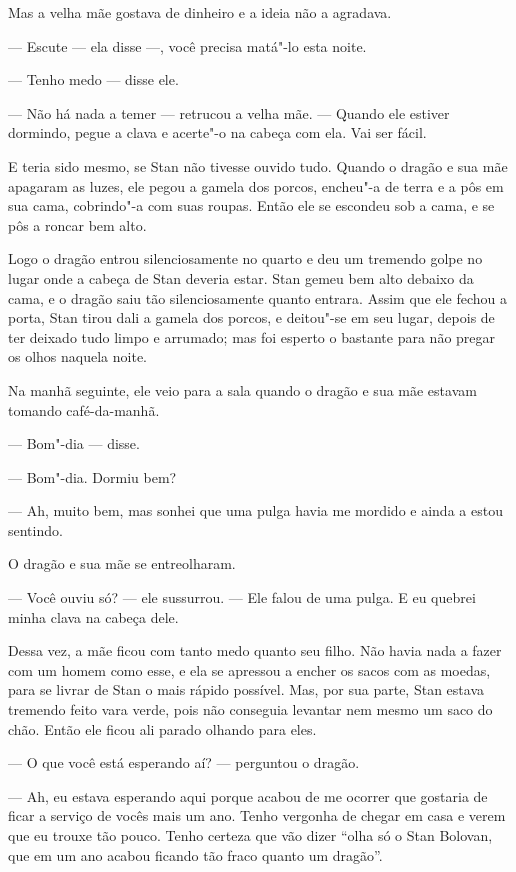 Mas a velha mãe gostava de dinheiro e a ideia não a agradava.

--- Escute --- ela disse ---, você precisa matá"-lo esta noite.

--- Tenho medo --- disse ele.

--- Não há nada a temer --- retrucou a velha mãe. --- Quando ele estiver
dormindo, pegue a clava e acerte"-o na cabeça com ela. Vai ser fácil.

E teria sido mesmo, se Stan não tivesse ouvido tudo. Quando o dragão e
sua mãe apagaram as luzes, ele pegou a gamela dos porcos, encheu"-a de
terra e a pôs em sua cama, cobrindo"-a com suas roupas. Então ele se
escondeu sob a cama, e se pôs a roncar bem alto.

Logo o dragão entrou silenciosamente no quarto e deu um tremendo golpe
no lugar onde a cabeça de Stan deveria estar. Stan gemeu bem alto
debaixo da cama, e o dragão saiu tão silenciosamente quanto entrara.
Assim que ele fechou a porta, Stan tirou dali a gamela dos porcos, e
deitou"-se em seu lugar, depois de ter deixado tudo limpo e arrumado;
mas foi esperto o bastante para não pregar os olhos naquela noite.

Na manhã seguinte, ele veio para a sala quando o dragão e sua mãe
estavam tomando café-da-manhã.

--- Bom"-dia --- disse.

--- Bom"-dia. Dormiu bem?

--- Ah, muito bem, mas sonhei que uma pulga havia me mordido e ainda a
estou sentindo.

O dragão e sua mãe se entreolharam.

--- Você ouviu só? --- ele sussurrou. --- Ele falou de uma pulga. E eu
quebrei minha clava na cabeça dele.

Dessa vez, a mãe ficou com tanto medo quanto seu filho. Não havia nada
a fazer com um homem como esse, e ela se apressou a encher os sacos
com as moedas, para se livrar de Stan o mais rápido possível. Mas,
por sua parte, Stan estava tremendo feito vara verde, pois não
conseguia levantar nem mesmo um saco do chão. Então ele ficou ali
parado olhando para eles.

--- O que você está esperando aí? --- perguntou o dragão.

--- Ah, eu estava esperando aqui porque acabou de me ocorrer que
gostaria de ficar a serviço de vocês mais um ano. Tenho vergonha de
chegar em casa e verem que eu trouxe tão pouco. Tenho certeza que vão
dizer “olha só o Stan Bolovan, que em um ano acabou ficando tão fraco
quanto um dragão”.

